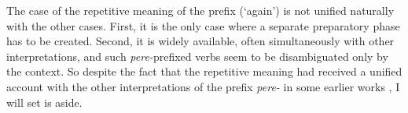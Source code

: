 The case of the repetitive meaning of the prefix (`again') is not unified naturally with the other cases. First, it is the only case where a separate preparatory phase has to be created. Second, it is widely available, often simultaneously with other interpretations, and such \textit{pere-}prefixed verbs seem to be disambiguated only by the context. So despite the fact that the repetitive meaning had received a unified account with the other interpretations of the prefix \textit{pere-} in some earlier works \citep{Demjjanow:97, Kagan:book}, I will set is aside.





